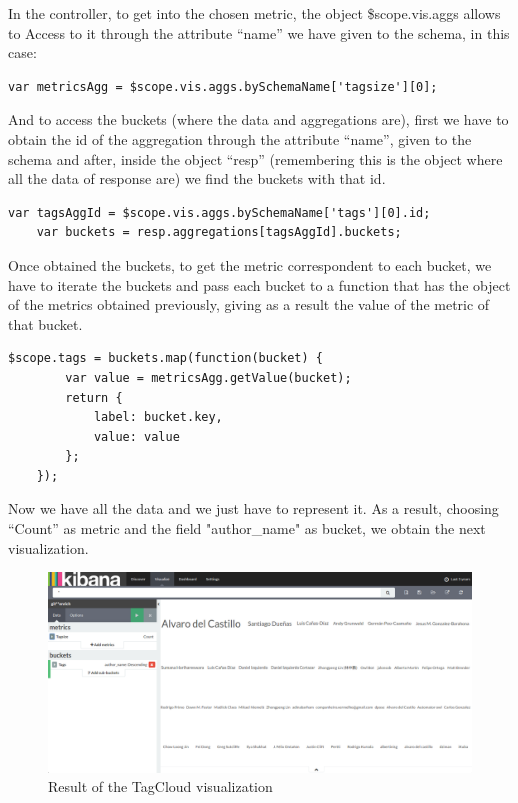 \documentclass[a4paper, 12pt]{book}
\begin{document}
In the controller, to get into the chosen metric, the object \$scope.vis.aggs allows to Access to it through the attribute “name” we have given to the schema, in this case:

\begin{lstlisting}[frame=single]
	var metricsAgg = $scope.vis.aggs.bySchemaName['tagsize'][0];
\end{lstlisting}

And to access the buckets (where the data and aggregations are), first we have to obtain the id of the aggregation through the attribute “name”, given to the schema and after, inside the object “resp” (remembering this is the object where all the data of response are) we find the buckets with that id.

\begin{lstlisting}[frame=single]
	var tagsAggId = $scope.vis.aggs.bySchemaName['tags'][0].id;
	var buckets = resp.aggregations[tagsAggId].buckets;
\end{lstlisting}

Once obtained the buckets, to get the metric correspondent to each bucket, we have to iterate the buckets and pass each bucket to a function that has the object of the metrics obtained previously, giving as a result the value of the metric of that bucket.

\begin{lstlisting}[frame=single]
	$scope.tags = buckets.map(function(bucket) {
		var value = metricsAgg.getValue(bucket);
		return {
			label: bucket.key,
			value: value
		};
	});
\end{lstlisting}

Now we have all the data and we just have to represent it. As a result, choosing “Count” as metric and the field "author\_name" as bucket, we obtain the next visualization.

\begin{figure}[H]
  \centering
  \includegraphics[width=16cm, keepaspectratio]{img/development/tagcloud}
  \caption{Result of the TagCloud visualization}
  \label{fig:plugintagcolud}
\end{figure}
\end{document}
